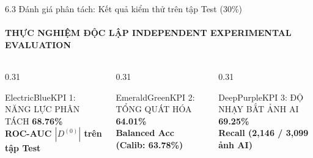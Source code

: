 \documentclass[aspectratio=169, 10pt, t]{beamer}
\begin{document}
\begin{frame}{6.3 Đánh giá phân tách: Kết quả kiểm thử trên tập Test (30\%)}
  \framesubtitle{THỰC NGHIỆM ĐỘC LẬP \;\textbar\; INDEPENDENT EXPERIMENTAL EVALUATION}
  
  \begin{columns}[T, totalwidth=\linewidth]
    \begin{column}{0.31\linewidth}
      \begin{statbox}{ElectricBlue}{KPI 1: NĂNG LỰC PHÂN TÁCH}
        {\fontsize{13}{15}\selectfont\textbf{\textcolor{ElectricBlue}{68.76\%}}}\\[0.05em]
        {\tiny\textbf{\textcolor{MidnightNavy}{ROC-AUC $|D^{(0)}|$ trên tập Test}}}
      \end{statbox}
    \end{column}
    \begin{column}{0.31\linewidth}
      \begin{statbox}{EmeraldGreen}{KPI 2: TỔNG QUÁT HÓA}
        {\fontsize{13}{15}\selectfont\textbf{\textcolor{EmeraldGreen}{64.01\%}}}\\[0.05em]
        {\tiny\textbf{\textcolor{MidnightNavy}{Balanced Acc (Calib: 63.78\%)}}}
      \end{statbox}
    \end{column}
    \begin{column}{0.31\linewidth}
      \begin{statbox}{DeepPurple}{KPI 3: ĐỘ NHẠY BẮT ẢNH AI}
        {\fontsize{13}{15}\selectfont\textbf{\textcolor{DeepPurple}{69.25\%}}}\\[0.05em]
        {\tiny\textbf{\textcolor{MidnightNavy}{Recall (2,146 / 3,099 ảnh AI)}}}
      \end{statbox}
    \end{column}
  \end{columns}

  \vspace{0.10em}


\end{frame}
\end{document}
